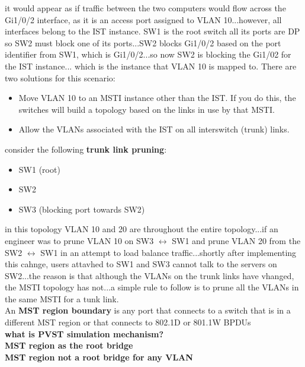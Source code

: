 \documentclass{article}
\begin{document}
it would appear as if traffic between the two computers would flow across the Gi1/0/2 interface, as it is an access port assigned to VLAN 10...however, all interfaces belong to the IST instance. SW1 is the root switch all its ports are DP so SW2 must block one of its ports...SW2 blocks Gi1/0/2 based on the port identifier from SW1, which is Gi1/0/2...so now SW2 is blocking the Gi1/02 for the IST instance... which is the instance that VLAN 10 is mapped to. There are two solutions for this scenario:
	\begin{itemize}
		\item Move VLAN 10 to an MSTI instance other than the IST. If you do this, the switches will build a topology based on the links in use by that MSTI.
		\item Allow the VLANs associated with the IST on all interswitch (trunk) links.
	\end{itemize}

consider the following \textbf{trunk link pruning}:
	\begin{itemize}
		\item SW1 (root)
		\item SW2
		\item SW3 (blocking port towards SW2)
	\end{itemize}
in this topology VLAN 10 and 20 are throughout the entire topology...if an engineer was to prune VLAN 10 on SW3 $\leftrightarrow$ SW1 and prune VLAN 20 from the SW2 $\leftrightarrow$ SW1 in an attempt to load balance traffic...shortly after implementing this cahnge, users attavhed to SW1 and SW3 cannot talk to the servers on SW2...the reason is that although the VLANs on the trunk links have vhanged, the MSTI topology has not...a simple rule to follow is to prune all the VLANs in the same MSTI for a tunk link.\\

An \textbf{MST region boundary} is any port that connects to a switch that is in a different MST region or that connects to 802.1D or 801.1W BPDUs\\

\textbf{what is PVST simulation mechanism?}\\

\textbf{MST region as the root bridge}\\
\textbf{MST region not a root bridge for any VLAN}\\
\end{document}
